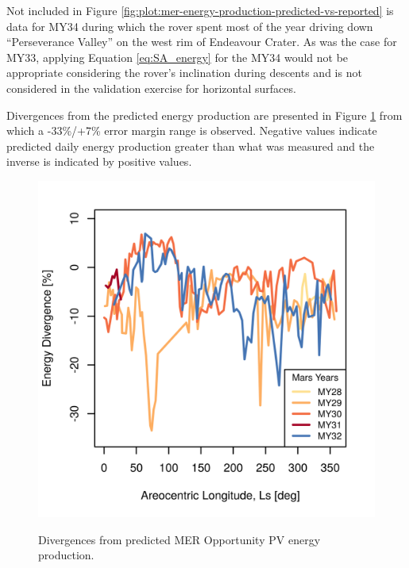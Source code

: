 
Not included in Figure \ref{fig:plot:mer-energy-production-predicted-vs-reported} is data for MY34 during which the rover spent most of the year driving down ``Perseverance Valley'' on the west rim of Endeavour Crater. As was the case for MY33, applying Equation \ref{eq:SA_energy} for the MY34 would not be appropriate considering the rover's inclination during descents and is not considered in the validation exercise for horizontal surfaces.


Divergences from the predicted energy production are presented in Figure \ref{fig:plot:mer-energy-prediction-divergences} from which a -33\%/+7\% error margin range is observed. Negative values indicate predicted daily energy production greater than what was measured and the inverse is indicated by positive values.

\begin{figure}[h]
  \centering
  \hypersetup{linkcolor=captionTextColor}
  \includegraphics[width=0.5\linewidth]{sections/mars-solar-energy/photovoltaic-energy/plots/energy-prediction-divergences-from-my28-to-my32.png}\\
  \caption[Divergences from predicted \ac{MER} Opportunity \ac{PV} energy production]
          {Divergences from predicted \ac{MER} Opportunity \ac{PV} energy production.}
  \label{fig:plot:mer-energy-prediction-divergences}
\end{figure}

